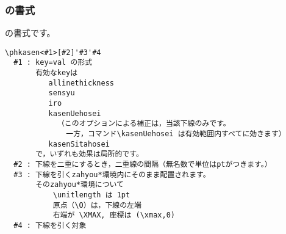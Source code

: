 \subsubsection{の書式}
の書式です。

\begin{boxnote}
\begin{verbatim}
\phkasen<#1>[#2]'#3'#4
  #1 : key=val の形式
       有効なkeyは
          allinethickness
          sensyu
          iro
          kasenUehosei
            （このオプションによる補正は，当該下線のみです。
              一方，コマンド\kasenUehosei は有効範囲内すべてに効きます）
          kasenSitahosei
       で，いずれも効果は局所的です。
  #2 : 下線を二重にするとき，二重線の間隔（無名数で単位はptがつきます。）
  #3 : 下線を引くzahyou*環境内にそのまま配置されます。
       そのzahyou*環境について
           \unitlength は 1pt
           原点（\O）は，下線の左端
           右端が \XMAX, 座標は (\xmax,0)
  #4 : 下線を引く対象
\end{verbatim}
\end{boxnote}
